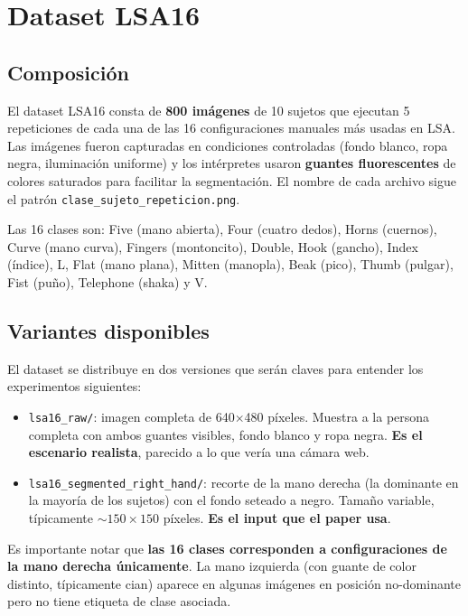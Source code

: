 \documentclass[a4paper,11pt]{article}
\begin{document}
\section{Dataset LSA16}
\label{sec:dataset}

\subsection{Composición}

El dataset LSA16 consta de \textbf{800 imágenes} de 10 sujetos que ejecutan 5 repeticiones de cada una de las 16 configuraciones manuales más usadas en LSA. Las imágenes fueron capturadas en condiciones controladas (fondo blanco, ropa negra, iluminación uniforme) y los intérpretes usaron \textbf{guantes fluorescentes} de colores saturados para facilitar la segmentación. El nombre de cada archivo sigue el patrón \texttt{clase\_sujeto\_repeticion.png}.

Las 16 clases son: Five (mano abierta), Four (cuatro dedos), Horns (cuernos), Curve (mano curva), Fingers (montoncito), Double, Hook (gancho), Index (índice), L, Flat (mano plana), Mitten (manopla), Beak (pico), Thumb (pulgar), Fist (puño), Telephone (shaka) y V.

\subsection{Variantes disponibles}

El dataset se distribuye en dos versiones que serán claves para entender los experimentos siguientes:

\begin{itemize}[itemsep=2pt]
    \item \texttt{lsa16\_raw/}: imagen completa de 640$\times$480 píxeles. Muestra a la persona completa con ambos guantes visibles, fondo blanco y ropa negra. \textbf{Es el escenario realista}, parecido a lo que vería una cámara web.
    \item \texttt{lsa16\_segmented\_right\_hand/}: recorte de la mano derecha (la dominante en la mayoría de los sujetos) con el fondo seteado a negro. Tamaño variable, típicamente ${\sim}150\times150$ píxeles. \textbf{Es el input que el paper usa}.
\end{itemize}

Es importante notar que \textbf{las 16 clases corresponden a configuraciones de la mano derecha únicamente}. La mano izquierda (con guante de color distinto, típicamente cian) aparece en algunas imágenes en posición no-dominante pero no tiene etiqueta de clase asociada.
\end{document}
